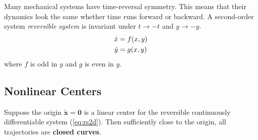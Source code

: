 Many mechanical systems have time-reversal symmetry.
This means that their dynamics look the same whether time runs forward or backward.
A second-order system \emph{reversible system} is invariant under $t\rightarrow-t$ and $y\rightarrow-y$.
\begin{equation}{\label{eq:rs2d}}
	\begin{aligned}
		\dot{x}&=f(x,y)\\
		\dot{y}&=g(x,y)
	\end{aligned}
\end{equation}
where $f$ is odd in $y$ and $g$ is even in $y$.
\subsection*{Nonlinear Centers}
\begin{theorem}
	Suppose the origin $\mathbf{\tilde{x}}=\mathbf{0}$ is a linear center for the reversible continuously differentiable system (\ref{eq:rs2d}).
	Then sufficiently close to the origin, all trajectories are \textbf{closed curves}.
\end{theorem}